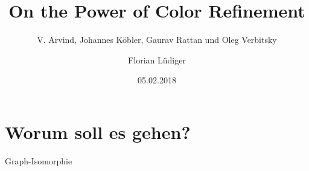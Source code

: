 \documentclass{beamer}
\title{On the Power of Color Refinement}
\subtitle{V. Arvind, Johannes Köbler, Gaurav Rattan und Oleg Verbitsky}
\date{05.02.2018}
\author{Florian Lüdiger}
\institute{Seminar Algorithm Engineering - Lehrstuhl 11 - TU Dortmund}
\begin{document}
  \maketitle
  \section{Worum soll es gehen?}
  \begin{frame}{Graph-Isomorphie}
    
  \end{frame}
\end{document}
